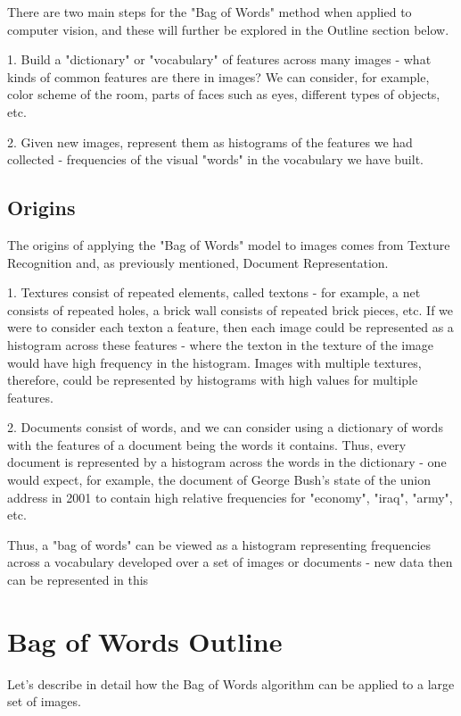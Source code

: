 \documentclass{article}
\begin{document}
There are two main steps for the "Bag of Words" method when applied to computer vision, and these will further be explored in the Outline section below. 

1. Build a "dictionary" or "vocabulary" of features across many images - what kinds of common features are there in images? We can consider, for example, color scheme of the room, parts of faces such as eyes, different types of objects, etc.

2. Given new images, represent them as histograms of the features we had collected - frequencies of the visual "words" in the vocabulary we have built. 
\subsection{Origins}
The origins of applying the "Bag of Words" model to images comes from Texture Recognition and, as previously mentioned, Document Representation. 

1. Textures consist of repeated elements, called textons - for example, a net consists of repeated holes, a brick wall consists of repeated brick pieces, etc. If we were to consider each texton a feature, then each image could be represented as a histogram across these features - where the texton in the texture of the image would have high frequency in the histogram. Images with multiple textures, therefore, could be represented by histograms with high values for multiple features.  

2. Documents consist of words, and we can consider using a dictionary of words with the features of a document being the words it contains. Thus, every document is represented by a histogram across the words in the dictionary - one would expect, for example, the document of George Bush's state of the union address in 2001 to contain high relative frequencies for "economy", "iraq", "army", etc. 

Thus, a "bag of words" can be viewed as a histogram representing frequencies across a vocabulary developed over a set of images or documents - new data then can be represented in this 

\section{Bag of Words Outline}
Let's describe in detail how the Bag of Words algorithm can be applied to a large set of images.
\end{document}
